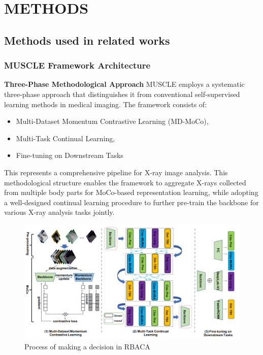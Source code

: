 \documentclass{IEEEcsmag}
\begin{document}
\section{METHODS}

    \subsection{Methods used in related works}

    \subsubsection{MUSCLE Framework Architecture}    
    \textbf{Three-Phase Methodological Approach}
    MUSCLE employs a systematic three-phase approach that distinguishes it from conventional self-supervised learning methods in medical imaging\cite{cite-17}.
    The framework consists of:
    \begin{itemize}
        \item Multi-Dataset Momentum Contrastive Learning (MD-MoCo), 
        \item Multi-Task Continual Learning,
        \item Fine-tuning on Downstream Tasks
    \end{itemize}
    This represents a comprehensive pipeline for X-ray image analysis. 
    This methodological structure enables the framework to aggregate X-rays collected from multiple body parts for MoCo-based representation learning, while adopting a well-designed continual learning procedure to further pre-train the backbone for various X-ray analysis tasks jointly\cite{cite-17}.


    \begin{figure}
        \centering
        \includegraphics[width=\linewidth]{images/Cite-17-img-1.png}
        \caption{Process of making a decision in RBACA}
        \label{fig:Cite-17-img-1}
    \end{figure}
    
\end{document}
